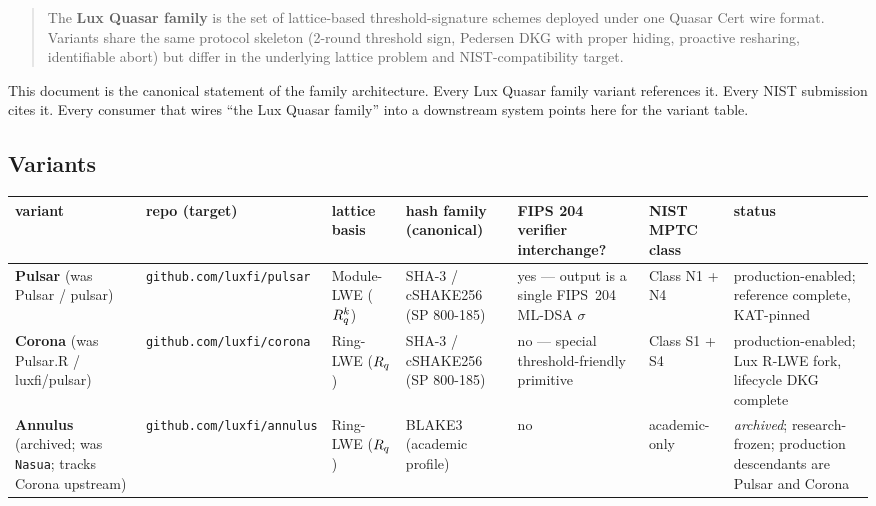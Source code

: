 
\begin{quote}
The \textbf{Lux Quasar family} is the set of lattice-based
threshold-signature schemes deployed under one Quasar Cert wire
format. Variants share the same protocol skeleton (2-round
threshold sign, Pedersen DKG with proper hiding, proactive
resharing, identifiable abort) but differ in the underlying lattice
problem and NIST-compatibility target.
\end{quote}

This document is the canonical statement of the family architecture.
Every Lux Quasar family variant references it. Every NIST submission
cites it. Every consumer that wires ``the Lux Quasar family'' into a
downstream system points here for the variant table.

\subsection{Variants}

\begin{center}
\small
\begin{tabular}{p{2.3cm}p{3.0cm}p{1.8cm}p{2.6cm}p{2.2cm}p{1.6cm}p{2.4cm}}
\toprule
variant & repo (target) & lattice basis & hash family (canonical) &
  FIPS 204 verifier interchange? & NIST MPTC class & status \\
\midrule
\textbf{Pulsar} (was Pulsar / pulsar) &
  \texttt{github.com/luxfi/pulsar} &
  Module-LWE ($R_q^k$) &
  SHA-3 / cSHAKE256 (SP 800-185) &
  yes --- output is a single FIPS~204 ML-DSA $\sigma$ &
  Class N1 + N4 &
  production-enabled; reference complete, KAT-pinned \\
\textbf{Corona} (was Pulsar.R / luxfi/pulsar) &
  \texttt{github.com/luxfi/corona} &
  Ring-LWE ($R_q$) &
  SHA-3 / cSHAKE256 (SP 800-185) &
  no --- special threshold-friendly primitive &
  Class S1 + S4 &
  production-enabled; Lux R-LWE fork, lifecycle DKG complete \\
\textbf{Annulus} (archived; was \texttt{Nasua}; tracks Corona upstream) &
  \texttt{github.com/luxfi/annulus} &
  Ring-LWE ($R_q$) &
  BLAKE3 (academic profile) &
  no &
  academic-only &
  \emph{archived}; research-frozen; production descendants are Pulsar and Corona \\
\bottomrule
\end{tabular}
\end{center}

